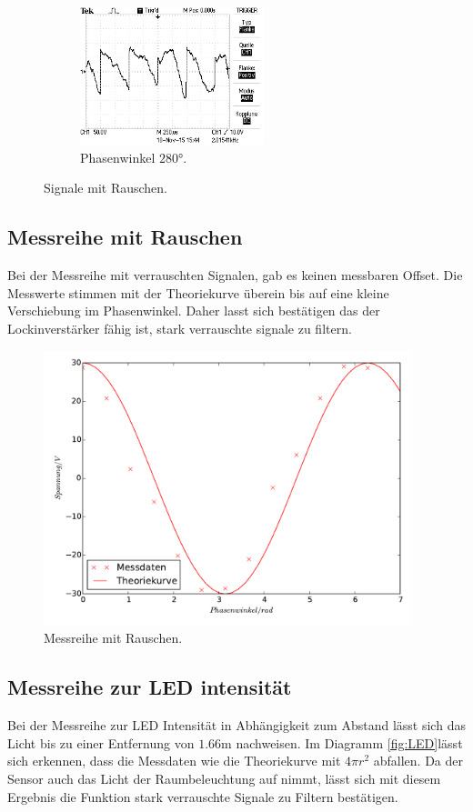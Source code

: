 \begin{figure}
\begin{subfigure}{0.48\textwidth}
\label{fig:rp190}
\end{subfigure}
\begin{subfigure}{0.48\textwidth}
\centering
\includegraphics[height=4cm]{Bilder/r/r280.JPG}
\caption{Phasenwinkel $280°$.}
\label{fig:rp280}
\end{subfigure}
\caption{Signale mit Rauschen.}
\label{fig:Signale mit Rauschen}
\end{figure}

\subsection{Messreihe mit Rauschen}
\label{sec:Messreihe mit Rauschen}
Bei der Messreihe mit verrauschten Signalen, gab es keinen messbaren Offset. Die
Messwerte stimmen mit der Theoriekurve überein bis auf eine kleine Verschiebung
im Phasenwinkel. Daher lasst sich bestätigen das der Lockinverstärker fähig ist,
stark verrauschte signale zu filtern.
\begin{figure}
  \centering
  \includegraphics[height=8cm]{r_signal.pdf}
  \caption{Messreihe mit Rauschen.}
  \label{fig:Mr}
\end{figure}

\subsection{Messreihe zur LED intensität}
\label{sec:Messreihe zur LED intensität}
Bei der Messreihe zur LED Intensität in Abhängigkeit zum Abstand lässt sich das
Licht bis zu einer Entfernung von $1.66\si{\meter}$ nachweisen. Im Diagramm
\eqref{fig:LED}lässt sich erkennen, dass die Messdaten wie die Theoriekurve mit
$ 4\pi r^2$ abfallen. Da der Sensor auch das Licht der Raumbeleuchtung auf nimmt,
 lässt sich mit diesem Ergebnis die Funktion stark verrauschte Signale zu
Filtern bestätigen.

